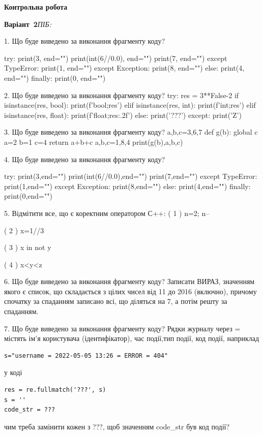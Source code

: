 \documentclass[11pt]{article}
\begin{document}
{\large\textbf{Контрольна робота}}

\textbf{Варіант \No\,2}\hfill \textit{ПІБ:}\,\underline{\hspace{60mm}}
\vspace{4mm}

1. Що буде виведено за виконання фрагменту коду?

try:
    print(3, end="")
    print(int(6//0.0), end="")
    print(7, end="")
except TypeError: 
    print(1, end="")
except Exception: 
    print(8, end="")
else:
    print(4, end="")
finally:
    print(0, end="")



2. Що буде виведено за виконання фрагменту коду?
try:
    res = 3**False-2
    if isinstance(res, bool):
        print(f'bool;{res}')
    elif isinstance(res, int):
        print(f'int;{res}')
    elif isinstance(res, float):
        print(f'float;{res:.2f}')
    else:
        print('???')
except:
    print('Z')


3. Що буде виведено за виконання фрагменту коду?
a,b,c=3,6,7
    def g(b):
      global c      a=2
      b=1
      c=4
      return a+b+c
    a,b,c=1,8,4
    print(g(b),a,b,c)

4. Що буде виведено за виконання фрагменту коду?

try:
    print(3,end="")
    print(int(6//0.0),end="")
    print(7,end="")
except TypeError: print(1,end="")
except Exception: print(8,end="")
else: print(4,end="")
finally: print(0,end="")



5. %
Відмітити все, що є коректним оператором С++:
( 1 ) n=2; n--

( 2 ) x=1//3

( 3 ) x in not y

( 4 ) x<y<z


6. Що буде виведено за виконання фрагменту коду?
Записати ВИРАЗ, значенням якого є список, що складається з цілих чисел від 11 до 2016 (включно), причому спочатку за спаданням записано всі, що діляться на 7, а потім решту за спаданням.


7. Що буде виведено за виконання фрагменту коду?
Рядки журналу через = містять ім'я користувача (ідентифікатор), час події,тип події, код події, наприклад
\begin{verbatim}
s="username = 2022-05-05 13:26 = ERROR = 404"
\end{verbatim}
у коді 
\begin{verbatim}
res = re.fullmatch('???', s) 
s = ''
code_str = ??? 
\end{verbatim}
чим треба замінити кожен з ???, щоб значенням code\_str був код події? 
\end{document}
